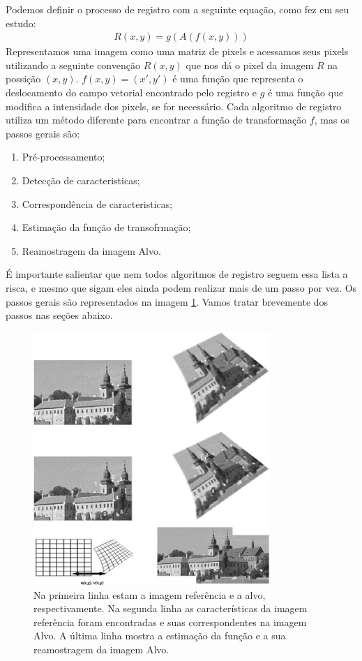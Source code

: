 Podemos definir o processo de registro com a seguinte equação, como \cite{brown1992survey} fez em seu estudo:
\begin{align}\label{eq:defregistro}
    R(x,y) = g(A(f(x,y)))
\end{align}
    Representamos uma imagem como uma matriz de pixels e acessamos seus pixels utilizando a seguinte convenção $R(x,y)$ 
que nos dá o pixel da imagem $R$ na possição $(x,y)$. $f(x,y) = (x',y')$ é uma função que representa o deslocamento do 
campo vetorial encontrado pelo registro e $g$ é uma função que modifica a intensidade dos pixels, se for necessário. 
Cada algoritmo de registro utiliza um método diferente para encontrar a função de transformação $f$, mas os passos gerais são:
\begin{enumerate}
    \item Pré-processamento;
    \item Detecção de caracteristicas;
    \item Correspondência de caracteristicas;
    \item Estimação da função de transofrmação;
    \item Reamostragem da imagem Alvo.
\end{enumerate}
    É importante salientar que nem todos algoritmos de registro seguem essa lista a risca, e mesmo que sigam eles ainda
podem realizar mais de um passo por vez. Os passos gerais são representados na imagem \ref{fig:regExplicacao}. 
Vamos tratar brevemente dos passos nas seções abaixo.
\begin{figure}[H]
    \centering
    \includegraphics[width=0.8\textwidth]{figuras/regSteps.jpg}
    \caption{Na primeira linha estam a imagem referência e a alvo, respectivamente. Na segunda linha as características
da imagem referência foram encontradas e suas correspondentes na imagem Alvo. A última linha mostra a estimação da 
função e a sua reamostragem da imagem Alvo. \citep{zitova2003image}}
    \label{fig:regExplicacao}
\end{figure}

